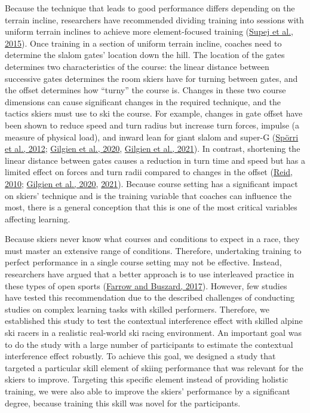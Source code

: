 \documentclass[letterpaper,10pt]{article}
\begin{document}
Because the technique that leads to good performance differs depending on the terrain incline, researchers have recommended dividing training into sessions with uniform terrain inclines to achieve more element-focused training (\href{https://www.frontiersin.org/articles/10.3389/fbioe.2022.966041/full\#B45}{Supej et al., 2015}). Once training in a section of uniform terrain incline, coaches need to determine the slalom gates’ location down the hill. The location of the gates determines two characteristics of the course: the linear distance between successive gates determines the room skiers have for turning between gates, and the offset determines how “turny” the course is. Changes in these two course dimensions can cause significant changes in the required technique, and the tactics skiers must use to ski the course. For example, changes in gate offset have been shown to reduce speed and turn radius but increase turn forces, impulse (a measure of physical load), and inward lean for giant slalom and super-G (\href{https://www.frontiersin.org/articles/10.3389/fbioe.2022.966041/full\#B43}{Spörri et al., 2012}; \href{https://www.frontiersin.org/articles/10.3389/fbioe.2022.966041/full\#B13}{Gilgien et al., 2020}, \href{https://www.frontiersin.org/articles/10.3389/fbioe.2022.966041/full\#B12}{Gilgien et al., 2021}). In contrast, shortening the linear distance between gates causes a reduction in turn time and speed but has a limited effect on forces and turn radii compared to changes in the offset (\href{https://www.frontiersin.org/articles/10.3389/fbioe.2022.966041/full\#B35}{Reid, 2010}; \href{https://www.frontiersin.org/articles/10.3389/fbioe.2022.966041/full\#B13}{Gilgien et al., 2020}, \href{https://www.frontiersin.org/articles/10.3389/fbioe.2022.966041/full\#B12}{2021}). Because course setting has a significant impact on skiers’ technique and is the training variable that coaches can influence the most, there is a general conception that this is one of the most critical variables affecting learning.

Because skiers never know what courses and conditions to expect in a race, they must master an extensive range of conditions. Therefore, undertaking training to perfect performance in a single course setting may not be effective. Instead, researchers have argued that a better approach is to use interleaved practice in these types of open sports (\href{https://www.frontiersin.org/articles/10.3389/fbioe.2022.966041/full\#B10}{Farrow and Buszard, 2017}). However, few studies have tested this recommendation due to the described challenges of conducting studies on complex learning tasks with skilled performers. Therefore, we established this study to test the contextual interference effect with skilled alpine ski racers in a realistic real-world ski racing environment. An important goal was to do the study with a large number of participants to estimate the contextual interference effect robustly. To achieve this goal, we designed a study that targeted a particular skill element of skiing performance that was relevant for the skiers to improve. Targeting this specific element instead of providing holistic training, we were also able to improve the skiers’ performance by a significant degree, because training this skill was novel for the participants.
\end{document}
